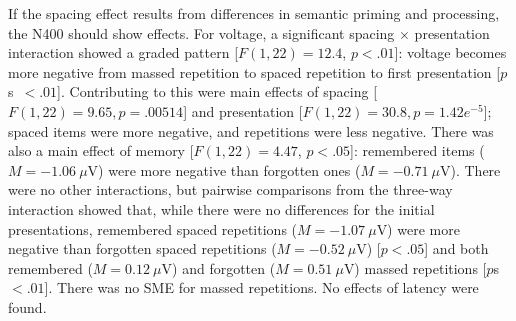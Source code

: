 If the spacing effect results from differences in semantic priming and processing, the N400 should show effects.
For voltage, a significant spacing $\times$ presentation interaction showed a graded pattern [$F(1,22)=12.4$, $p<.01$]: voltage becomes more negative from massed repetition to spaced repetition to first presentation [$p$s~$<.01$].  Contributing to this were main effects of spacing [$F(1,22)=9.65, p=.00514$] and presentation [$F(1,22)=30.8, p=1.42e^{-5}$]; spaced items were more negative, and repetitions were less negative.  There was also a main effect of memory [$F(1,22)=4.47$, $p<.05$]: remembered items ($M=-1.06~\mu$V) were more negative than forgotten ones ($M=-0.71~\mu$V).
There were no other interactions, but pairwise comparisons from the three-way interaction showed that, while there were no differences for the initial presentations, remembered spaced repetitions ($M=-1.07~\mu$V) were more negative than forgotten spaced repetitions ($M=-0.52~\mu$V) [$p<.05$] and both remembered ($M=0.12~\mu$V) and forgotten ($M=0.51~\mu$V) massed repetitions [$p$s~$<.01$].  There was no SME for massed repetitions.
No effects of latency were found.

